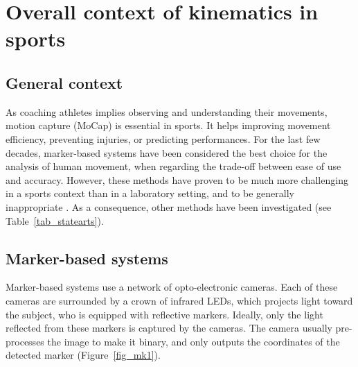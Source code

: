 \minitoc
\newpage



\FloatBarrier
\section{Overall context of kinematics in sports}
\subsection{General context}

As coaching athletes implies observing and understanding their movements, motion capture (MoCap) is essential in sports. It helps improving movement efficiency, preventing injuries, or predicting performances. For the last few decades, marker-based systems have been considered the best choice for the analysis of human movement, when regarding the trade-off between ease of use and accuracy. However, these methods have proven to be much more challenging in a sports context than in a laboratory setting, and to be generally inappropriate \cite{Mündermann2006, Colyer2018}. As a consequence, other methods have been investigated (see Table~\ref{tab_statearts}).

\subsection{Marker-based systems}

Marker-based systems use a network of opto-electronic cameras. Each of these cameras are surrounded by a crown of infrared LEDs, which projects light toward the subject, who is equipped with reflective markers. Ideally, only the light reflected from these markers is captured by the cameras. The camera usually pre-processes the image to make it binary, and only outputs the coordinates of the detected marker (Figure~\ref{fig_mk1}). 

